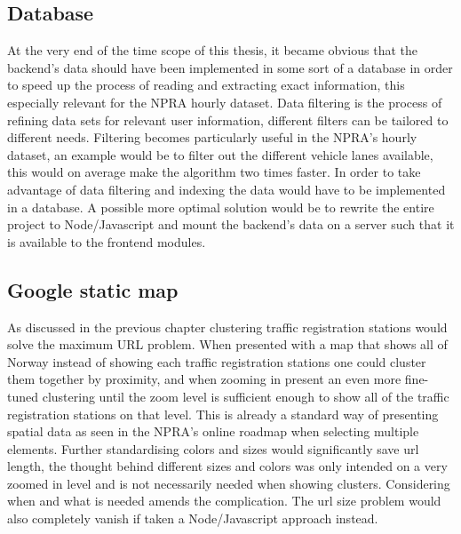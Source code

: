 \subsection{Database}
At the very end of the time scope of this thesis, it became obvious that the backend's data should have been implemented in some sort of a database in order to speed up the process of reading and extracting exact information, this especially relevant for the NPRA hourly dataset. Data filtering is the process of refining data sets for relevant user information, different filters can be tailored to different needs. Filtering becomes particularly useful in the NPRA's hourly dataset, an example would be to filter out the different vehicle lanes available, this would on average make the algorithm two times faster. In order to take advantage of data filtering and indexing the data would have to be implemented in a database. A possible more optimal solution would be to rewrite the entire project to Node/Javascript and mount the backend's data on a server such that it is available to the frontend modules.

\subsection{Google static map}
As discussed in the previous chapter clustering traffic registration stations would solve the maximum URL problem. When presented with a map that shows all of Norway instead of showing each traffic registration stations one could cluster them together by proximity, and when zooming in present an even more fine-tuned clustering until the zoom level is sufficient enough to show all of the traffic registration stations on that level. This is already a standard way of presenting spatial data as seen in the NPRA's online roadmap\cite{vegkart} when selecting multiple elements. Further standardising colors and sizes would significantly save url length, the thought behind different sizes and colors was only intended on a very zoomed in level and is not necessarily needed when showing clusters. Considering when and what is needed amends the complication. The url size problem would also completely vanish if taken a Node/Javascript approach instead.

